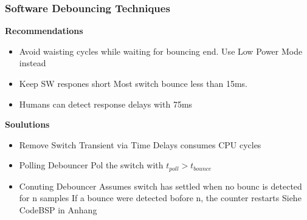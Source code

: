 \subsubsection{Software Debouncing Techniques }
\begin{multicols}{2}
\textbf{Recommendations}\newline
\begin{itemize}
    \item Avoid waisting cycles while waiting for bouncing end.
        \subitem Use Low Power Mode instead
    \item Keep SW respones short
        \subitem Most switch bounce less than 15ms.
    \item Humans can detect response delays with 75ms
\end{itemize}

\columnbreak
\textbf{Soulutions}\newline
\begin{itemize}
    \item Remove Switch Transient via Time Delays
        \subitem consumes CPU cycles
    \item Polling Debouncer
        \subitem Pol the switch with $ t_{poll} > t_{bounce} $
    \item Conuting Debouncer
        \subitem Assumes switch has settled when no bounc is detected for n samples
        \subitem If a bounce were detected bofore n, the counter restarts 
        \subitem Siehe CodeBSP in Anhang \label{CountingDebouncer}     
\end{itemize}
\end{multicols}

\clearpage